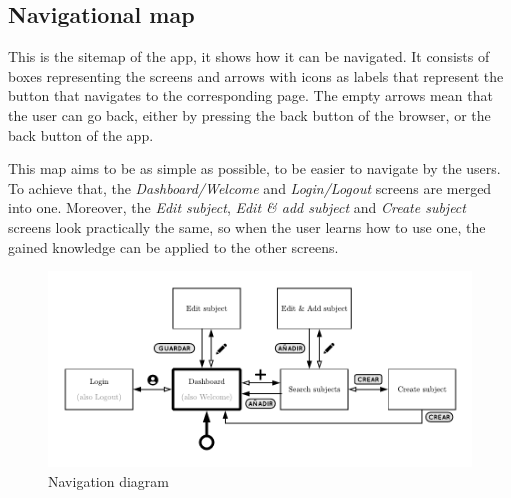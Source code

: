 \clearpage\newpage
\subsection{Navigational map}

This is the sitemap of the app, it shows how it can be navigated. It consists of boxes representing the screens and arrows with icons as labels that represent the button that navigates to the corresponding page. The empty arrows mean that the user can go back, either by pressing the back button of the browser, or the back button of the app. 

This map aims to be as simple as possible, to be easier to navigate by the users. To achieve that, the \textit{Dashboard/Welcome} and \textit{Login/Logout} screens are merged into one. Moreover, the \textit{Edit subject}, \textit{Edit \& add subject} and \textit{Create subject} screens look practically the same, so when the user learns how to use one, the gained knowledge can be applied to the other screens.

\vfill
\begin{figure}[ht!]
    \center
    \includegraphics[width=1\columnwidth]{media/diagrams/navigation.pdf}
    \caption{Navigation diagram}
    \label{fig:ux_diagram}
\end{figure}
\vfill